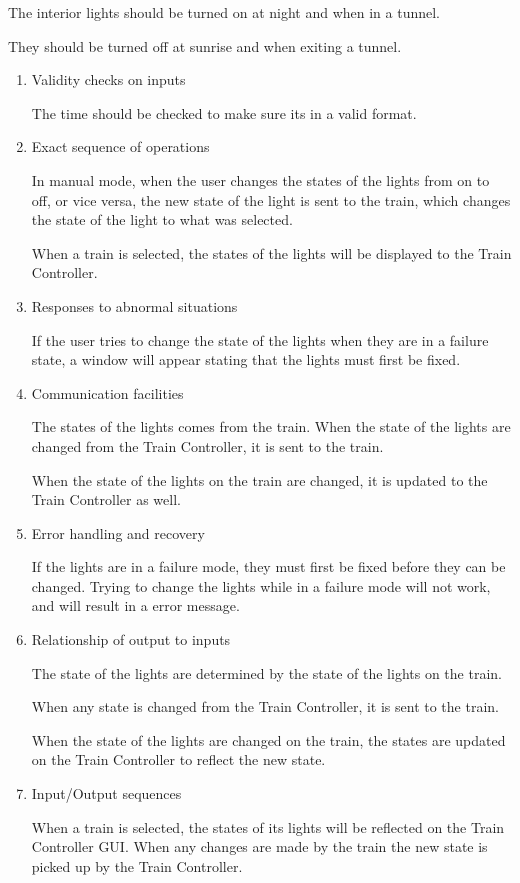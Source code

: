 \documentclass[11pt]{article}
\begin{document}
\begin{enumerate}
The interior lights should be turned on at night and when in a tunnel.

They should be turned off at sunrise and when exiting a tunnel.
\begin{enumerate}
\item Validity checks on inputs
\label{sec-3-1-5-5-1}

The time should be checked to make sure its in a valid format.
\item Exact sequence of operations
\label{sec-3-1-5-5-2}

In manual mode, when the user changes the states of the lights from on to off, or vice versa, the new state of the light is sent to the train, which changes the state of the light to what was selected. 

When a train is selected, the states of the lights will be displayed to the Train Controller.
\item Responses to abnormal situations
\label{sec-3-1-5-5-3}

If the user tries to change the state of the lights when they are in a failure state, a window will appear stating that the lights must first be fixed. 
\item Communication facilities
\label{sec-3-1-5-5-4}

The states of the lights comes from the train. When the state of the lights are changed from the Train Controller, it is sent to the train. 

When the state of the lights on the train are changed, it is updated to the Train Controller as well. 
\item Error handling and recovery
\label{sec-3-1-5-5-5}

If the lights are in a failure mode, they must first be fixed before they can be changed. Trying to change the lights while in a failure mode will not work, and will result in a error message. 
\item Relationship of output to inputs
\label{sec-3-1-5-5-6}

The state of the lights are determined by the state of the lights on the train. 

When any state is changed from the Train Controller, it is sent to the train. 

When the state of the lights are changed on the train, the states are updated on the Train Controller to reflect the new state. 
\item Input/Output sequences
\label{sec-3-1-5-5-7}

When a train is selected, the states of its lights will be reflected on the Train Controller GUI. When any changes are made by the train the new state is picked up by the Train Controller. 


\end{enumerate}
\end{enumerate}
\end{document}
